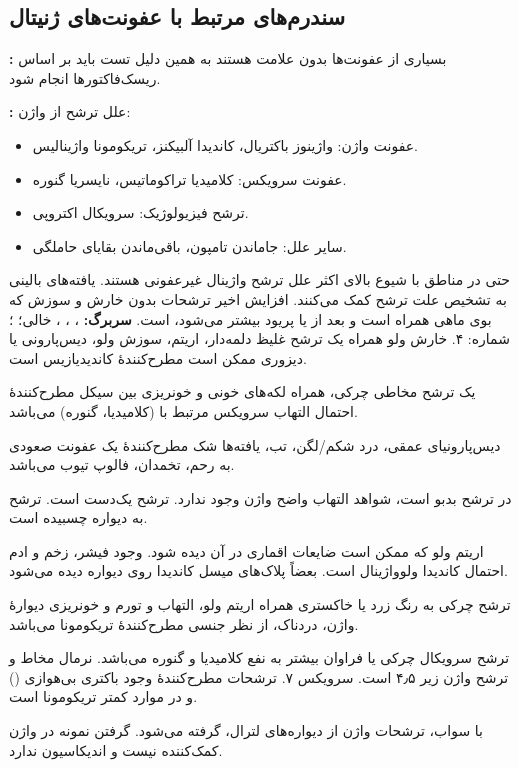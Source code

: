 \documentclass[12pt,a4paper]{article}
\begin{document}
\subsection*{سندرم‌های مرتبط با عفونت‌های ژنیتال}
\textbf{:} بسیاری از عفونت‌ها بدون علامت هستند به همین دلیل تست باید بر اساس ریسک‌فاکتورها انجام شود.

\textbf{:} علل ترشح از واژن:
\begin{itemize}
\item عفونت واژن: واژینوز باکتریال، کاندیدا آلبیکنز، تریکومونا واژینالیس.
\item عفونت سرویکس: کلامیدیا تراکوماتیس، نایسریا گنوره.
\item ترشح فیزیولوژیک: سرویکال اکتروپی.
\item سایر علل: جاماندن تامپون، باقی‌ماندن بقایای حاملگی.
\end{itemize}
حتی در مناطق با شیوع بالای  اکثر علل ترشح واژینال غیرعفونی هستند.
یافته‌های بالینی به تشخیص علت ترشح کمک می‌کنند.
افزایش اخیر ترشحات بدون خارش و سوزش که بوی ماهی همراه است و بعد از  یا پریود بیشتر می‌شود،  است.
\textbf{سربرگ:} ، ، ،  خالی؛ ؛ شماره: ۴.
خارش ولو همراه یک ترشح غلیظ دلمه‌دار، اریتم، سوزش ولو، دیس‌پارونی یا دیزوری ممکن است مطرح‌کنندهٔ کاندیدیازیس است.

یک ترشح مخاطی چرکی، همراه لکه‌های خونی و خونریزی بین سیکل مطرح‌کنندهٔ احتمال التهاب سرویکس مرتبط با  (کلامیدیا، گنوره) می‌باشد.

دیس‌پارونیای عمقی، درد شکم/لگن، تب، یافته‌ها شک مطرح‌کنندهٔ یک عفونت صعودی به رحم، تخمدان، فالوپ تیوب می‌باشد.

در  ترشح بدبو است، شواهد التهاب واضح واژن وجود ندارد. ترشح یک‌دست است. ترشح به دیواره چسبیده است.

اریتم ولو که ممکن است ضایعات اقماری در آن دیده شود. وجود فیشر، زخم و ادم احتمال کاندیدا ولوواژینال است. بعضاً پلاک‌های میسل کاندیدا روی دیواره دیده می‌شود.

ترشح چرکی به رنگ زرد یا خاکستری همراه اریتم ولو، التهاب و تورم و خونریزی دیوارهٔ واژن،  دردناک، از نظر جنسی مطرح‌کنندهٔ تریکومونا می‌باشد.

ترشح سرویکال چرکی یا فراوان بیشتر به نفع کلامیدیا و گنوره می‌باشد.
 نرمال مخاط و ترشح واژن زیر ۴٫۵ است.  سرویکس ۷.
 ترشحات مطرح‌کنندهٔ وجود باکتری بی‌هوازی () و در موارد کمتر تریکومونا است.

با سواب، ترشحات واژن از دیواره‌های لترال،  گرفته می‌شود.
گرفتن نمونه در واژن کمک‌کننده نیست و اندیکاسیون ندارد.
\end{document}
